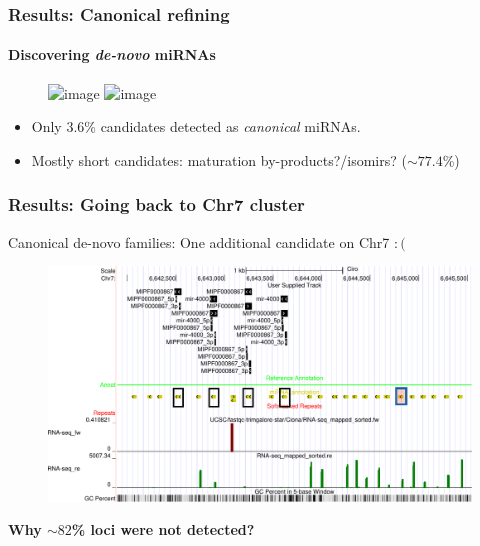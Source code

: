 \begin{frame}[t]
    \frametitle{Results: Canonical refining}
    \framesubtitle{Discovering \textit{de-novo} miRNAs}
    \begin{figure}[h!]
        \centering
        \includegraphics<1>[width=\linewidth]{Figures/results_workflowALL}\label{fig:workflow} %
        \includegraphics<2>[width=0.55\linewidth]{Figures/isomir_example2}\label{fig:workflow} %
    \end{figure}
    \begin{itemize}
        \item<1>[-] Only $3.6$\% candidates detected as \textit{canonical} miRNAs.
        \item<2>[-] Mostly short candidates: maturation by-products?/isomirs? ($\sim 77.4$\%)
    \end{itemize}
\end{frame}

\begin{frame}[t]
    \frametitle{Results: Going back to Chr7 cluster}
    Canonical de-novo families: One additional candidate on Chr7 $:($
    \begin{figure}[h!]
        \centering
        \includegraphics[width=0.9\linewidth]{Figures/homology_coverage_denonvo} %
    \end{figure}
    \textbf{Why $\sim82$\% loci were not detected?} 
\end{frame}

